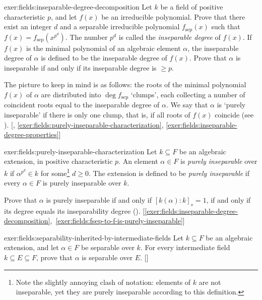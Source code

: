 \begin{exer}{}{exer:fields:inseparable-degree-decomposition}
  Let $k$ be a field of positive characteristic $p$, and let $f(x)$ be
  an irreducible polynomial. Prove that there exist an integer $d$ and
  a separable irreducible polynomial $f_{\mathrm{sep}}(x)$ such that
  $f(x) = f_{\mathrm{sep}}(x^{p^d})$. The number $p^d$ is called the
  \emph{inseparable degree} of $f(x)$. If $f(x)$ is the minimal
  polynomial of an algebraic element $\alpha$, the inseparable degree
  of $\alpha$ is defined to be the inseparable degree of $f(x)$. Prove
  that $\alpha$ is inseparable if and only if its inseparable degree
  is $\geq p$.

  The picture to keep in mind is as follows: the roots of the minimal
  polynomial $f(x)$ of $\alpha$ are distributed into
  $\deg f_{\mathrm{sep}}$ `clumps', each collecting a number of
  coincident roots equal to the inseparable degree of $\alpha$. We say
  that $\alpha$ is `purely inseparable' if there is only one clump,
  that is, if all roots of $f(x)$ coincide (see
  ). [,
  \ref{exer:fields:purely-inseparable-characterization},
  \ref{exer:fields:inseparable-degree-properties}]
\end{exer}
\begin{exer}{}{exer:fields:purely-inseparable-characterization}
  Let $k \subseteq F$ be an algebraic extension, in positive
  characteristic $p$. An element $\alpha \in F$ is \emph{purely
    inseparable} over $k$ if $\alpha^{p^d} \in k$ for
  some\footnote{Note the slightly annoying clash of notation: elements
    of $k$ are not inseparable, yet they are purely inseparable
    according to this definition.} $d \geq 0$. The extension is
  defined to be \emph{purely inseparable} if every $\alpha \in F$ is
  purely inseparable over $k$.

  Prove that $\alpha$ is purely inseparable if and only if
  $[k(\alpha) : k]_s = 1$, if and only if its degree equals its
  inseparability degree
  ().\@
  [\ref{exer:fields:inseparable-degree-decomposition},~\ref{exer:fields:fsep-to-f-is-purely-inseparable}]
\end{exer}
\begin{exer}{}{exer:fields:separability-inherited-by-intermediate-fields}
  Let $k \subseteq F$ be an algebraic extension, and let
  $\alpha \in F$ be separable over $k$. For every intermediate field
  $k \subseteq E \subseteq F$, prove that $\alpha$ is separable over
  $E$. []
\end{exer}
